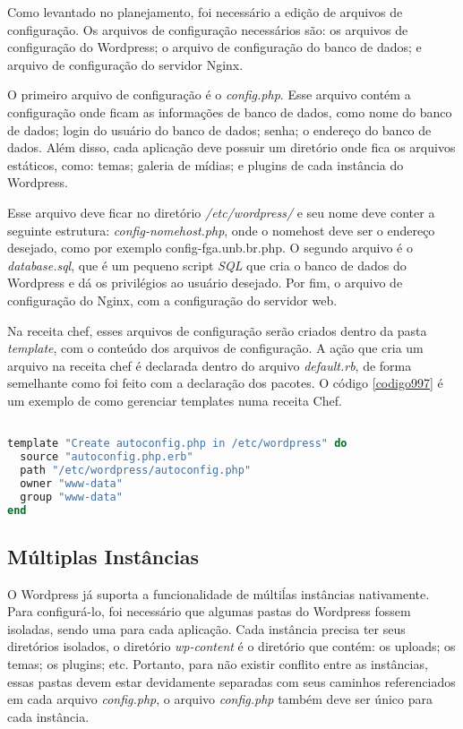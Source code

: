 Como levantado no planejamento, foi necessário a edição de arquivos de configuração. Os
arquivos de configuração necessários são: os arquivos de configuração do Wordpress; 
o arquivo de configuração do banco de dados; e arquivo de configuração do servidor Nginx.

O primeiro arquivo de configuração é o \textit{config.php}. Esse arquivo contém a
configuração onde ficam as informações de banco de dados, como nome do banco de dados;
login do usuário do banco de dados; senha; o endereço do banco de dados. Além disso,
cada aplicação deve possuir um diretório
onde fica os arquivos estáticos, como: temas; galeria de mídias; e plugins 
de cada instância do Wordpress.

Esse arquivo deve ficar no diretório \textit{/etc/wordpress/} e seu nome deve conter
a seguinte estrutura: \textit{config-nomehost.php}, onde o nomehost deve ser o endereço
desejado, como por exemplo config-fga.unb.br.php. O segundo arquivo é o \textit{database.sql}, que é um pequeno script \textit{SQL} que
cria o banco de dados do Wordpress e dá os privilégios ao usuário desejado. Por fim,
o arquivo de configuração do Nginx, com a configuração do servidor web.

Na receita chef, esses arquivos de configuração serão criados dentro da pasta 
\textit{template}, com o conteúdo dos arquivos de configuração. A ação que cria 
um arquivo na receita chef é 
declarada dentro do arquivo \textit{default.rb}, de forma semelhante como foi feito com
a declaração dos pacotes. O código \ref{codigo997} é um exemplo de como 
gerenciar templates numa receita Chef.

\begin{lstlisting}[language=Ruby,label=dice_index,caption={Exemplo de criação de templates com o chef}, label=codigo997]

template "Create autoconfig.php in /etc/wordpress" do
  source "autoconfig.php.erb"
  path "/etc/wordpress/autoconfig.php"
  owner "www-data"
  group "www-data"
end
\end{lstlisting}

\subsection{Múltiplas Instâncias}

O Wordpress já suporta a funcionalidade de múltiĺas instâncias nativamente. Para configurá-lo, foi necessário que algumas pastas do Wordpress
fossem isoladas, sendo uma para cada aplicação. Cada instância precisa
ter seus diretórios isolados, o diretório \textit{wp-content} é o diretório 
que contém: os uploads; os temas; os plugins; etc. Portanto, para não
existir conflito entre as instâncias, essas pastas devem estar devidamente separadas
com seus caminhos referenciados em cada arquivo \textit{config.php}, o arquivo 
\textit{config.php} também
deve ser único para cada instância. 

